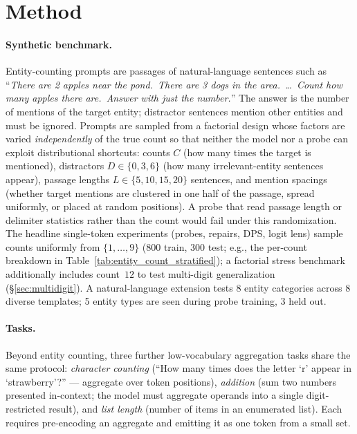 \documentclass{article}
\begin{document}
\section{Method}
\label{sec:method}

\paragraph{Synthetic benchmark.}
Entity-counting prompts are passages of natural-language sentences such as
``\emph{There are 2 apples near the pond.\ There are 3 dogs in the area.\ \ldots\
Count how many apples there are.\ Answer with just the number.}'' The answer is
the number of mentions of the target entity; distractor sentences mention other
entities and must be ignored. Prompts are sampled from a factorial design whose
factors are varied \emph{independently} of the true count so that neither the
model nor a probe can exploit distributional shortcuts: counts
$C$ (how many times the target is mentioned), distractors $D \in \{0,3,6\}$
(how many irrelevant-entity sentences appear), passage lengths
$L \in \{5,10,15,20\}$ sentences, and mention spacings (whether target mentions
are clustered in one half of the passage, spread uniformly, or placed at random
positions). A probe that read passage length or delimiter statistics rather than
the count would fail under this randomization.
The headline single-token experiments (probes, repairs, DPS, logit lens) sample
counts uniformly from $\{1,\ldots,9\}$ (800 train, 300 test; e.g., the
per-count breakdown in Table~\ref{tab:entity_count_stratified}); a factorial
stress benchmark additionally includes count~$12$ to test multi-digit
generalization (\S\ref{sec:multidigit}). A natural-language extension tests 8
entity categories across 8 diverse templates; 5 entity types are seen during
probe training, 3 held out.

\paragraph{Tasks.}
Beyond entity counting, three further low-vocabulary aggregation tasks share
the same protocol: \emph{character counting} (``How many times does the letter
`r' appear in `strawberry'?'' --- aggregate over token positions), \emph{addition}
(sum two numbers presented in-context; the model must aggregate operands into a
single digit-restricted result), and \emph{list length} (number of items in an
enumerated list). Each requires pre-encoding an aggregate and emitting it as one
token from a small set.
\end{document}

